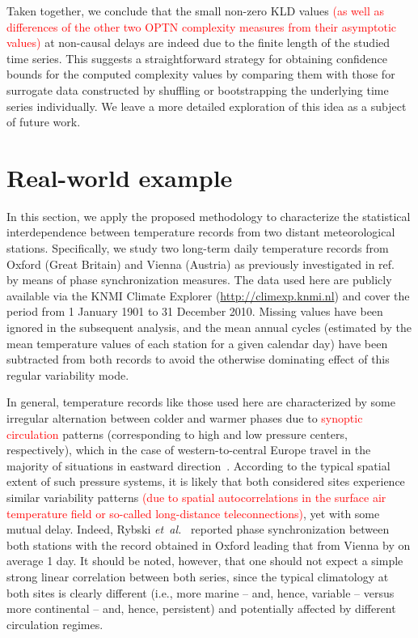\documentclass[12pt,aip,cha,reprint,nofootinbib]{revtex4-1}
\begin{document}
Taken together, we conclude that the small non-zero KLD values \textcolor{red}{(as well as differences of the other two OPTN complexity measures from their asymptotic values)} at non-causal delays are indeed due to the finite length of the studied time series. This suggests a straightforward strategy for obtaining confidence bounds for the computed {\color{red}complexity} values by comparing them with those for surrogate data constructed by shuffling or bootstrapping the underlying time series individually. We leave a more detailed exploration of this idea as a subject of future work.


\section{Real-world example}  \label{sec:exp}
In this section, we apply the proposed methodology to characterize the statistical interdependence between temperature records from two distant meteorological stations. Specifically, we study two long-term daily temperature records from Oxford (Great Britain) and Vienna (Austria) as previously investigated in ref.~\cite{Rybski2003} by means of phase synchronization measures. The data used here are publicly available via the KNMI Climate Explorer (\url{http://climexp.knmi.nl}) and cover the period from 1 January 1901 to 31 December 2010. Missing values have been ignored in the subsequent analysis, and the mean annual cycles (estimated by the mean temperature values of each station for a given calendar day) have been subtracted from both records to avoid the otherwise dominating effect of this regular variability mode. 

In general, temperature records like those used here are characterized by some irregular alternation between colder and warmer phases due to \textcolor{red}{synoptic circulation} patterns (corresponding to high and low pressure centers, respectively), which in the case of western-to-central Europe travel in the majority of situations in eastward direction~{\color{red}\cite{Hannachi2012,Esteban2006}}. According to the typical spatial extent of such pressure systems, it is likely that both considered sites experience similar variability patterns \textcolor{red}{(due to spatial autocorrelations in the surface air temperature field or so-called long-distance teleconnections)}, yet with some mutual delay. Indeed, Rybski \emph{et~al.}~\cite{Rybski2003} reported phase synchronization between both stations with the record obtained in Oxford leading that from Vienna by on average 1 day. It should be noted, however, that one should not expect a simple strong linear correlation between both series, since the typical climatology at both sites is clearly different (i.e., more marine -- and, hence, variable -- versus more continental -- and, hence, persistent) and potentially affected by different circulation regimes.
\end{document}
